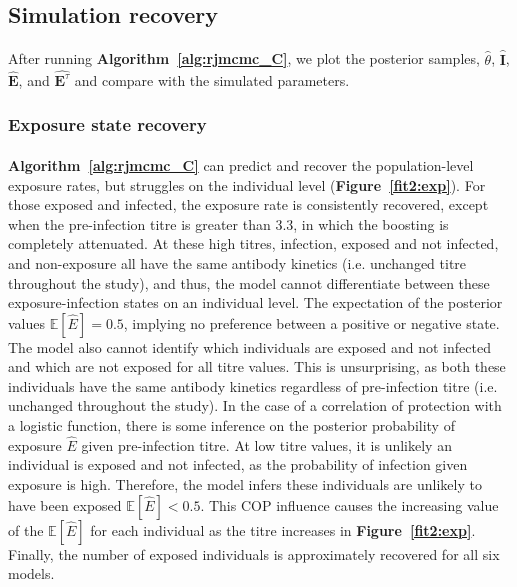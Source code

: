 \subsection{Simulation recovery }
\paragraph{}After running \textbf{Algorithm~\ref{alg:rjmcmc_C}}, we plot the posterior samples, $\hat{\theta}$, $\hat{\mathbf{I}}$,  $\hat{\mathbf{E}}$, and  $\hat{\mathbf{E}^\tau}$ and compare with the simulated parameters.

\subsubsection{Exposure state recovery}
\paragraph{} \textbf{Algorithm~\ref{alg:rjmcmc_C}} can predict and recover the population-level exposure rates, but struggles on the individual level (\textbf{Figure~\ref{fit2:exp}}). For those exposed and infected, the exposure rate is consistently recovered, except when the pre-infection titre is greater than 3.3, in which the boosting is completely attenuated. At these high titres, infection, exposed and not infected, and non-exposure all have the same antibody kinetics (i.e. unchanged titre throughout the study), and thus, the model cannot differentiate between these exposure-infection states on an individual level. The expectation of the posterior values $\mathbb{E}[\hat{E}] = 0.5$, implying no preference between a positive or negative state. The model also cannot identify which individuals are exposed and not infected and which are not exposed for all titre values. This is unsurprising, as both these individuals have the same antibody kinetics regardless of pre-infection titre (i.e. unchanged throughout the study). In the case of a correlation of protection with a logistic function, there is some inference on the posterior probability of exposure $\hat{E}$ given pre-infection titre. At low titre values, it is unlikely an individual is exposed and not infected, as the probability of infection given exposure is high. Therefore, the model infers these individuals are unlikely to have been exposed $\mathbb{E}[\hat{E}] < 0.5$. This COP influence causes the increasing value of the $\mathbb{E}[\hat{E}]$ for each individual as the titre increases in \textbf{Figure~\ref{fit2:exp}}. Finally, the number of exposed individuals is approximately recovered for all six models. 

